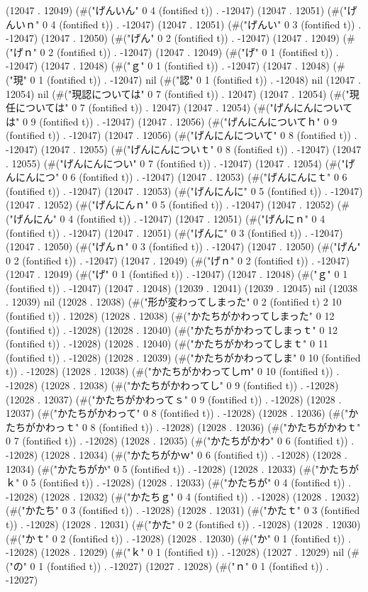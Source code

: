 (12047 . 12049) (#("げんいん" 0 4 (fontified t)) . -12047) (12047 . 12051) (#("げんいｎ" 0 4 (fontified t)) . -12047) (12047 . 12051) (#("げんい" 0 3 (fontified t)) . -12047) (12047 . 12050) (#("げん" 0 2 (fontified t)) . -12047) (12047 . 12049) (#("げｎ" 0 2 (fontified t)) . -12047) (12047 . 12049) (#("げ" 0 1 (fontified t)) . -12047) (12047 . 12048) (#("ｇ" 0 1 (fontified t)) . -12047) (12047 . 12048) (#("現" 0 1 (fontified t)) . -12047) nil (#("認" 0 1 (fontified t)) . -12048) nil (12047 . 12054) nil (#("現認については" 0 7 (fontified t)) . 12047) (12047 . 12054) (#("現任については" 0 7 (fontified t)) . 12047) (12047 . 12054) (#("げんにんについては" 0 9 (fontified t)) . -12047) (12047 . 12056) (#("げんにんについてｈ" 0 9 (fontified t)) . -12047) (12047 . 12056) (#("げんにんについて" 0 8 (fontified t)) . -12047) (12047 . 12055) (#("げんにんについｔ" 0 8 (fontified t)) . -12047) (12047 . 12055) (#("げんにんについ" 0 7 (fontified t)) . -12047) (12047 . 12054) (#("げんにんにつ" 0 6 (fontified t)) . -12047) (12047 . 12053) (#("げんにんにｔ" 0 6 (fontified t)) . -12047) (12047 . 12053) (#("げんにんに" 0 5 (fontified t)) . -12047) (12047 . 12052) (#("げんにんｎ" 0 5 (fontified t)) . -12047) (12047 . 12052) (#("げんにん" 0 4 (fontified t)) . -12047) (12047 . 12051) (#("げんにｎ" 0 4 (fontified t)) . -12047) (12047 . 12051) (#("げんに" 0 3 (fontified t)) . -12047) (12047 . 12050) (#("げんｎ" 0 3 (fontified t)) . -12047) (12047 . 12050) (#("げん" 0 2 (fontified t)) . -12047) (12047 . 12049) (#("げｎ" 0 2 (fontified t)) . -12047) (12047 . 12049) (#("げ" 0 1 (fontified t)) . -12047) (12047 . 12048) (#("ｇ" 0 1 (fontified t)) . -12047) (12047 . 12048) (12039 . 12041) (12039 . 12045) nil (12038 . 12039) nil (12028 . 12038) (#("形が変わってしまった" 0 2 (fontified t) 2 10 (fontified t)) . 12028) (12028 . 12038) (#("かたちがかわってしまった" 0 12 (fontified t)) . -12028) (12028 . 12040) (#("かたちがかわってしまっｔ" 0 12 (fontified t)) . -12028) (12028 . 12040) (#("かたちがかわってしまｔ" 0 11 (fontified t)) . -12028) (12028 . 12039) (#("かたちがかわってしま" 0 10 (fontified t)) . -12028) (12028 . 12038) (#("かたちがかわってしｍ" 0 10 (fontified t)) . -12028) (12028 . 12038) (#("かたちがかわってし" 0 9 (fontified t)) . -12028) (12028 . 12037) (#("かたちがかわってｓ" 0 9 (fontified t)) . -12028) (12028 . 12037) (#("かたちがかわって" 0 8 (fontified t)) . -12028) (12028 . 12036) (#("かたちがかわっｔ" 0 8 (fontified t)) . -12028) (12028 . 12036) (#("かたちがかわｔ" 0 7 (fontified t)) . -12028) (12028 . 12035) (#("かたちがかわ" 0 6 (fontified t)) . -12028) (12028 . 12034) (#("かたちがかｗ" 0 6 (fontified t)) . -12028) (12028 . 12034) (#("かたちがか" 0 5 (fontified t)) . -12028) (12028 . 12033) (#("かたちがｋ" 0 5 (fontified t)) . -12028) (12028 . 12033) (#("かたちが" 0 4 (fontified t)) . -12028) (12028 . 12032) (#("かたちｇ" 0 4 (fontified t)) . -12028) (12028 . 12032) (#("かたち" 0 3 (fontified t)) . -12028) (12028 . 12031) (#("かたｔ" 0 3 (fontified t)) . -12028) (12028 . 12031) (#("かた" 0 2 (fontified t)) . -12028) (12028 . 12030) (#("かｔ" 0 2 (fontified t)) . -12028) (12028 . 12030) (#("か" 0 1 (fontified t)) . -12028) (12028 . 12029) (#("ｋ" 0 1 (fontified t)) . -12028) (12027 . 12029) nil (#("の" 0 1 (fontified t)) . -12027) (12027 . 12028) (#("ｎ" 0 1 (fontified t)) . -12027) 